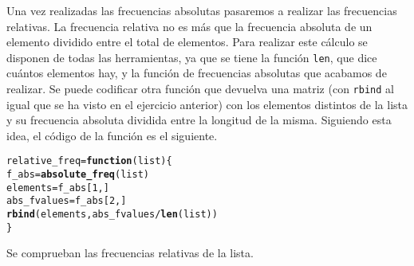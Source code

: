 \documentclass[12pt]{report}\usepackage[]{graphicx}\usepackage[dvipsnames]{xcolor}
\makeatletter
\newcommand{\hlnum}[1]{\textcolor[rgb]{0.686,0.059,0.569}{#1}}%
\newcommand{\hlopt}[1]{\textcolor[rgb]{0,0,0}{#1}}%
\newcommand{\hlstd}[1]{\textcolor[rgb]{0.345,0.345,0.345}{#1}}%
\newcommand{\hlkwa}[1]{\textcolor[rgb]{0.161,0.373,0.58}{\textbf{#1}}}%
\newcommand{\hlkwb}[1]{\textcolor[rgb]{0.69,0.353,0.396}{#1}}%
\newcommand{\hlkwc}[1]{\textcolor[rgb]{0.333,0.667,0.333}{#1}}%
\newcommand{\hlkwd}[1]{\textcolor[rgb]{0.737,0.353,0.396}{\textbf{#1}}}%
\newenvironment{kframe}{%
 \def\at@end@of@kframe{}%
 \ifinner\ifhmode%
  \def\at@end@of@kframe{\end{minipage}}%
  \begin{minipage}{\columnwidth}%
 \fi\fi%
 \def\FrameCommand##1{\hskip\@totalleftmargin \hskip-\fboxsep
 \colorbox{shadecolor}{##1}\hskip-\fboxsep
     \hskip-\linewidth \hskip-\@totalleftmargin \hskip\columnwidth}%
 \MakeFramed {\advance\hsize-\width
   \@totalleftmargin\z@ \linewidth\hsize
   \@setminipage}}%
 {\par\unskip\endMakeFramed%
 \at@end@of@kframe}
\newenvironment{knitrout}{}{} %
\makeatother
\begin{document}
			Una vez realizadas las frecuencias absolutas pasaremos a realizar las frecuencias relativas. La frecuencia relativa no es más que la frecuencia absoluta de un elemento dividido entre el total de elementos. Para realizar este cálculo se disponen de todas las herramientas, ya que se tiene la función \texttt{len}, que dice cuántos elementos hay, y la función de frecuencias absolutas que acabamos de realizar. Se puede codificar otra función que devuelva una matriz (con \texttt{rbind} al igual que se ha visto en el ejercicio anterior) con los elementos distintos de la lista y su frecuencia absoluta dividida entre la longitud de la misma. Siguiendo esta idea, el código de la función es el siguiente.
			
\begin{knitrout}
\color{fgcolor}\begin{kframe}
\begin{alltt}
\hlstd{relative_freq} \hlkwb{=} \hlkwa{function}\hlstd{(}\hlkwc{list}\hlstd{)\{}
        \hlstd{f_abs} \hlkwb{=} \hlkwd{absolute_freq}\hlstd{(list)}
        \hlstd{elements} \hlkwb{=} \hlstd{f_abs[}\hlnum{1}\hlstd{,]}
        \hlstd{abs_fvalues} \hlkwb{=} \hlstd{f_abs[}\hlnum{2}\hlstd{,]}
        \hlkwd{rbind}\hlstd{(elements,abs_fvalues}\hlopt{/}\hlkwd{len}\hlstd{(list))}
\hlstd{\}}
\end{alltt}
\end{kframe}
\end{knitrout}
			
			Se comprueban las frecuencias relativas de la lista.
			
\end{document}

